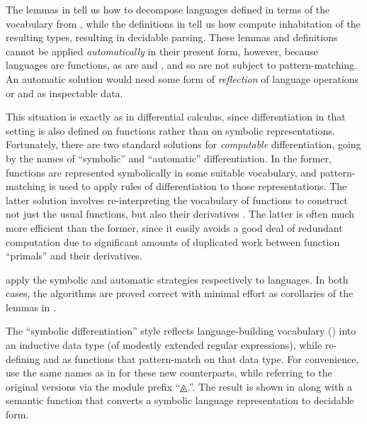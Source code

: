\documentclass[acmsmall,screen,anonymous,timestamp]{acmart}
\begin{document}

The lemmas in  tell us how to decompose languages defined in terms of the vocabulary from , while the definitions in  tell us how compute inhabitation of the resulting types, resulting in decidable parsing.
These lemmas and definitions cannot be applied \emph{automatically} in their present form, however, because languages are functions, as are  and , and so are not subject to pattern-matching.
An automatic solution would need some form of \emph{reflection} of language operations or  and  as inspectable data.

This situation is exactly as in differential calculus, since differentiation in that setting is also defined on functions rather than on symbolic representations.
Fortunately, there are two standard solutions for \emph{computable} differentiation, going by the names of ``symbolic'' and ``automatic'' differentiation.
In the former, functions are represented symbolically in some suitable vocabulary, and pattern-matching is used to apply rules of differentiation to those representations.
The latter solution involves re-interpreting the vocabulary of functions to construct not just the usual functions, but also their derivatives \needcite{}.
The latter is often much more efficient than the former, since it easily avoids a good deal of redundant computation due to significant amounts of duplicated work between function ``primals'' and their derivatives.

 apply the symbolic and automatic strategies respectively to languages.
In both cases, the algorithms are proved correct with minimal effort as corollaries of the lemmas in .

\rnc{}

\nc{}

The ``symbolic differentiation'' style reflects language-building vocabulary () into an inductive data type (of modestly extended regular expressions), while re-defining  and  as functions that pattern-match on that data type.
For convenience, use the same names as in  for these new counterparts, while referring to the original versions via the module prefix ``{◬.}\hspace{0.05em}''.
The result is shown in  along with a semantic function {} that converts a symbolic language representation to decidable form.
\end{document}
